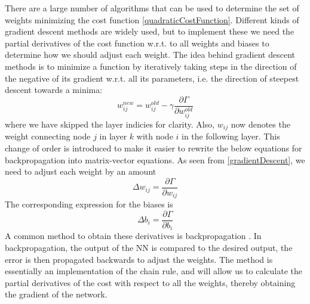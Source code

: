 \documentclass[twoside,english]{uiofysmaster}
\begin{document}
There are a large number of algorithms that can be used to determine the set of weights minimizing the 
cost function \eqref{quadraticCostFunction}. 
Different kinds of gradient descent methods are widely used, but to implement these we need the partial derivatives of
the cost function w.r.t. to all weights and biases to determine how we should adjust each weight. The idea behind gradient descent 
methods is to minimize a function by iteratively taking steps in the direction of the negative of its gradient w.r.t. 
all its parameters, i.e. the direction of steepest descent towards a minima:
\begin{equation}
 w_{ij}^{new} = w_{ij}^{old} - \gamma \frac{\partial \Gamma}{\partial w_{ij}^{old}}
 \label{gradientDescent}
\end{equation}
where we have skipped the layer indicies for clarity. Also, $w_{ij}$ now denotes the weight connecting node $j$ 
in layer $k$ with node $i$ in the following layer. This change of order is introduced to make it easier
to rewrite the below equations for backpropagation into matrix-vector equations. 
As seen from \eqref{gradientDescent}, we need to adjust each weight by an amount
\begin{equation}
\Delta w_{ij} = \frac{\partial \Gamma}{\partial w_{ij}}
\label{weightChange}
\end{equation}
The corresponding expression for the biases is
\begin{equation}
 \Delta b_i = \frac{\partial \Gamma}{\partial b_i}
\end{equation}
A common method to obtain these derivatives is backpropagation \cite{Rumelhart86}. 
In backpropagation, the output of the NN is compared to the desired output, the error is then propagated backwards
to adjust the weights. The method is essentially an implementation of the chain rule, and will allow us to calculate
the partial derivatives of the cost with respect to all the weights, thereby obtaining the gradient of the network. 
\end{document}
